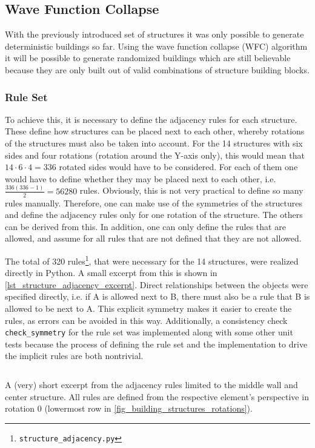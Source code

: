 \documentclass[
oneside,
fontsize=11pt
]{scrartcl}
\begin{document}
\subsection{Wave Function Collapse}
With the previously introduced set of structures it was only possible to generate deterministic
buildings so far. 
Using the wave function collapse (WFC) algorithm it will be possible to generate 
randomized buildings which are still believable 
because they are only built out of valid combinations of structure building blocks. 

\subsubsection{Rule Set}
\label{sec_rule_set}
To achieve this, it is necessary to define the adjacency rules for each structure. 
These define how structures can be placed next to each other, 
whereby rotations of the structures must also be taken into account. 
For the 14 structures with six sides and four rotations (rotation around the Y-axis only), 
this would mean that $14 \cdot 6 \cdot 4 = 336$ rotated sides would have to be considered. 
For each of them one would have to define whether they may be placed next to each other, 
i.e. $\frac{336 (336-1)}{2} = 56280$ rules. 
Obviously, this is not very practical to define so many rules manually. 
Therefore, one can make use of the symmetries of the structures 
and define the adjacency rules only for one rotation of the structure. 
The others can be derived from this. 
In addition, one can only define the rules that are allowed, 
and assume for all rules that are not defined that they are not allowed. 

The total of 320 rules\footnote{\texttt{structure\_adjacency.py}},
that were necessary for the 14 structures, were realized directly in Python. 
A small excerpt from this is shown in \autoref{lst_structure_adjacency_excerpt}. 
Direct relationships between the objects were specified directly, 
i.e. if A is allowed next to B, there must also be a rule that B is allowed to be next to A. 
This explicit symmetry makes it easier to create the rules, 
as errors can be avoided in this way. 
Additionally, a consistency check \texttt{check\_symmetry}
for the rule set was implemented along with some other unit tests
because the process of defining the rule set and 
the implementation to drive the implicit rules are both nontrivial.


\begin{listing}[ht]
  \inputminted[baselinestretch=0.55,linenos,breaklines]{python}{listings/structure_adjacency_excerpt.py}
  \caption{A (very) short excerpt from the adjacency rules limited to the middle wall and center structure.
    All rules are defined from the respective element's perspective in rotation 0 
    (lowermost row in \autoref{fig_building_structures_rotations}).
  }    
  \label{lst_structure_adjacency_excerpt}
\end{listing}
\end{document}
